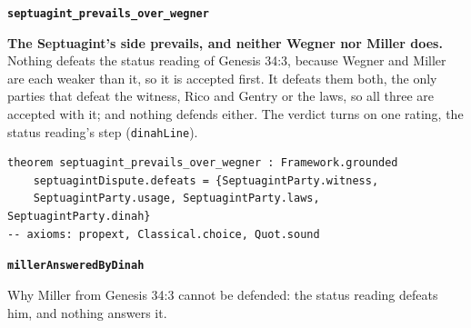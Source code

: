 \documentclass[11pt]{article}
\begin{document}
\par\medskip\noindent\textbf{\texttt{septuagint\_\allowbreak{}prevails\_\allowbreak{}over\_\allowbreak{}wegner}}\par\nobreak\noindent
\textbf{The Septuagint’s side prevails, and neither Wegner nor Miller does.} Nothing defeats the status reading of Genesis 34:3, because Wegner and Miller are each weaker than it, so it is accepted first. It defeats them both, the only parties that defeat the witness, Rico and Gentry or the laws, so all three are accepted with it; and nothing defends either. The verdict turns on one rating, the status reading’s step (\texttt{dinah\allowbreak{}Line}).

{\small\begin{verbatim}
theorem septuagint_prevails_over_wegner : Framework.grounded
    septuagintDispute.defeats = {SeptuagintParty.witness,
    SeptuagintParty.usage, SeptuagintParty.laws, SeptuagintParty.dinah}
-- axioms: propext, Classical.choice, Quot.sound
\end{verbatim}}
\par\medskip\noindent\textbf{\texttt{miller\allowbreak{}Answered\allowbreak{}By\allowbreak{}Dinah}}\par\nobreak\noindent
Why Miller from Genesis 34:3 cannot be defended: the status reading defeats him, and nothing answers it.
\end{document}
